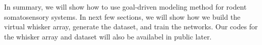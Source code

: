 In summary, we will show how to use goal-driven modeling method for rodent somatosensory systems. In next few sections, we will show how we build the virtual whisker array, generate the dataset, and train the networks. Our codes for the whisker array and dataset will also be availabel in public later.

